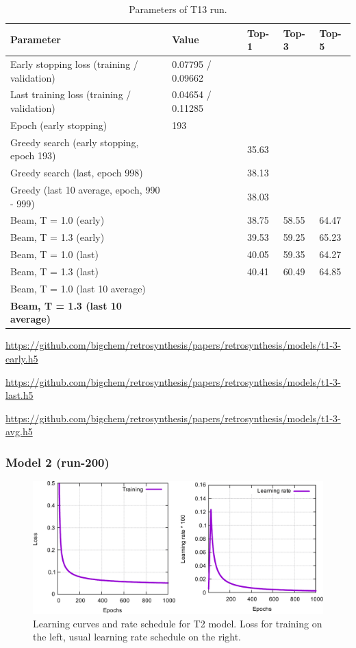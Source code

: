 \documentclass{article}
\begin{document}
\begin{table}[h!]
\caption{Parameters of T13 run.}
  \centering
  \begin{tabular}{p{6.2cm}p{3.5cm}p{1.5cm}p{1.5cm}p{1.5cm}}
    \toprule
    Parameter & Value & Top-1 & Top-3 & Top-5 \\
    \midrule
    Early stopping loss (training / validation) &  0.07795 / 0.09662 & & & \\
    Last training loss (training / validation) &  0.04654 / 0.11285  & & & \\
    Epoch (early stopping) & 193 & & & \\
    \midrule
    Greedy search (early stopping, epoch 193) &  & 35.63 & &\\
    Greedy search (last, epoch 998) &  & 38.13 & & \\
    Greedy (last 10 average, epoch, 990 - 999) & & 38.03 & & \\
    \midrule
    Beam, T = 1.0 (early) & & 38.75 & 58.55 &  64.47 \\
    Beam, T = 1.3 (early) & & 39.53 & 59.25 & 65.23 \\ 
    \midrule
    Beam, T = 1.0 (last) & & 40.05 & 59.35 &  64.27 \\
    Beam, T = 1.3 (last) & & 40.41 & 60.49 &  64.85 \\ 
    \midrule
    Beam, T = 1.0 (last 10 average) & &  &  &   \\
    \textbf{Beam, T = 1.3 (last 10 average)} & &  &  &   \\ 
    \bottomrule
  \end{tabular}
  \label{tbl:t12}

\end{table} 

\url{https://github.com/bigchem/retrosynthesis/papers/retrosynthesis/models/t1-3-early.h5}

\url{https://github.com/bigchem/retrosynthesis/papers/retrosynthesis/models/t1-3-last.h5}

\url{https://github.com/bigchem/retrosynthesis/papers/retrosynthesis/models/t1-3-avg.h5}

\newpage
 \subsubsection{Model 2 (run-200)}
 
\begin{figure}[h!]
  \centering
  \includegraphics[width = 16.5cm]{images/t2-1.pdf}
  \caption{Learning curves and rate schedule for T2 model. Loss for training on the left, usual learning rate schedule on the right.}
  \label{fig:t21}
\end{figure}
\end{document}
